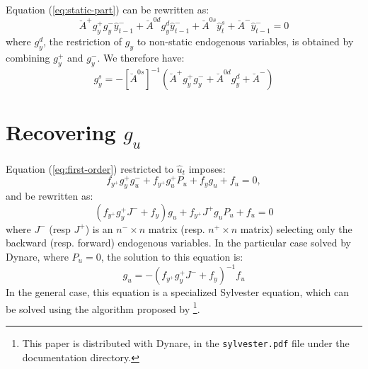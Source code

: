 \documentclass[11pt,a4paper]{article}
\begin{document}
Equation (\ref{eq:static-part}) can be rewritten as:
\begin{equation*}
  \breve{A}^+ g^+_y g^-_y \hat{y}^-_{t-1} + \breve{A}^{0d} g^d_y \hat{y}^-_{t-1} + \breve{A}^{0s} \hat{y}^{s}_t + \breve{A}^- \hat{y}^-_{t-1} = 0
\end{equation*}
where $g^d_y$, the restriction of $g_y$ to non-static endogenous variables, is
obtained by combining $g^+_y$ and $g^-_y$. We therefore have:
\begin{equation*}
  g^s_y = -\left[\breve{A}^{0s}\right]^{-1} \left(\breve{A}^+ g^+_y g^-_y + \breve{A}^{0d} g^d_y + \breve{A}^-\right)
\end{equation*}

\section{Recovering $g_u$}
\label{sec:g-u}

Equation (\ref{eq:first-order}) restricted to $\hat{u}_t$ imposes:
\begin{equation*}
  f_{y^+} g^+_yg^-_u+ f_{y^+}g^+_u P_u + f_y g_u + f_u = 0,
\end{equation*}
and be rewritten as:
\begin{equation*}
  (f_{y^+} g^+_y J^- + f_y) g_u + f_{y^+}J^+ g_u P_u + f_u = 0
\end{equation*}
where $J^-$ (resp $J^+$) is an $n^-\times n$ matrix (resp. $n^+\times n$
matrix) selecting only the backward (resp. forward) endogenous variables.  In
the particular case solved by Dynare, where $P_u = 0$, the solution to this
equation is:
\begin{equation*}
  g_u = -(f_{y^+} g^+_y J^- + f_y)^{-1} f_u
\end{equation*}
In the general case, this equation is a specialized Sylvester equation, which
can be solved using the algorithm proposed by
\citet{kamenik:2004}\footnote{This paper is distributed with Dynare, in the
  \texttt{sylvester.pdf} file under the documentation directory.}.



\end{document}
